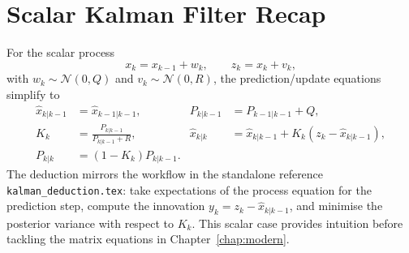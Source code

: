 \section{Scalar Kalman Filter Recap}
For the scalar process
\[
    x_k = x_{k-1} + w_k,\qquad z_k = x_k + v_k,
\]
with $w_k \sim \mathcal{N}(0,Q)$ and $v_k \sim \mathcal{N}(0,R)$, the prediction/update equations simplify to
\begin{align*}
    \hat{x}_{k|k-1} &= \hat{x}_{k-1|k-1}, & P_{k|k-1} &= P_{k-1|k-1} + Q,\\
    K_k &= \frac{P_{k|k-1}}{P_{k|k-1} + R}, &
    \hat{x}_{k|k} &= \hat{x}_{k|k-1} + K_k (z_k - \hat{x}_{k|k-1}),\\
    P_{k|k} &= (1 - K_k) P_{k|k-1}.
\end{align*}
The deduction mirrors the workflow in the standalone reference \texttt{kalman\_deduction.tex}: take expectations of the process equation for the prediction step, compute the innovation $y_k = z_k - \hat{x}_{k|k-1}$, and minimise the posterior variance with respect to $K_k$. This scalar case provides intuition before tackling the matrix equations in Chapter~\ref{chap:modern}.
